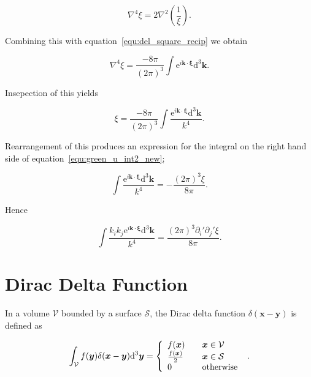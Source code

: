 \documentclass[12pt]{article}
\begin{document}
\begin{equation}
\label{equ:del4}
\nabla^{4} \xi = 2 \nabla^{2} \left(\frac{1}{\xi}\right) .
\end{equation}

Combining this with equation~\ref{equ:del_square_recip} we obtain

\begin{equation}
\label{equ:del4_int}
\nabla^{4} \xi = \frac{-8 \pi}{(2 \pi)^{3}} \int \mathrm{e}^{i \boldsymbol{k} \cdot \boldsymbol{\xi}} \mathrm{d}^{3} \boldsymbol{k} .
\end{equation}

Insepection of this yields

\begin{equation}
\label{equ:del4_int_int}
\xi = \frac{-8 \pi}{(2 \pi)^{3}} \int \frac{\mathrm{e}^{i \boldsymbol{k} \cdot \boldsymbol{\xi}} \mathrm{d}^{3} \boldsymbol{k}}{k^{4}} .
\end{equation}

Rearrangement of this produces an expression for the integral on the right hand side of equation~\ref{equ:green_u_int2_new};

\begin{equation}
\label{equ:green_u_int2_new_express}
\int \frac{\mathrm{e}^{i \boldsymbol{k} \cdot \boldsymbol{\xi}} \mathrm{d}^{3} \boldsymbol{k}}{k^{4}} = -\frac{(2 \pi)^{3} \xi}{8 \pi} .
\end{equation}

Hence

\begin{equation}
\label{equ:green_u_int2}
\int \frac{k_{i} k_{j} \mathrm{e}^{i \boldsymbol{k} \cdot \boldsymbol{\xi}} \mathrm{d}^{3} \boldsymbol{k}}{k^{4}} = \frac{(2 \pi)^{3} \partial_{i}' \partial_{j}' \xi}{8 \pi} .
\end{equation}

\section{Dirac Delta Function}
\label{app:delta}

In a volume $\mathcal{V}$ bounded by a surface $\mathcal{S}$, the Dirac delta function $\delta(\boldsymbol{x} - \boldsymbol{y})$ is defined as \citep{Riley06}

\begin{equation}
\label{equ:dirac}
\int_{\mathcal{V}} f(\boldsymbol{y}) \delta(\boldsymbol{x} - \boldsymbol{y}) \mathrm{d}^{3} \boldsymbol{y} = \left\{
    \begin{array}{l l}
      f(\boldsymbol{x}) &\quad \boldsymbol{x} \in \mathcal{V} \\
      \frac{f(\boldsymbol{x})}{2} &\quad \boldsymbol{x} \in \mathcal{S} \\
      0 & \quad \text{otherwise}
\end{array}
\right.\ .
\end{equation}
\end{document}
